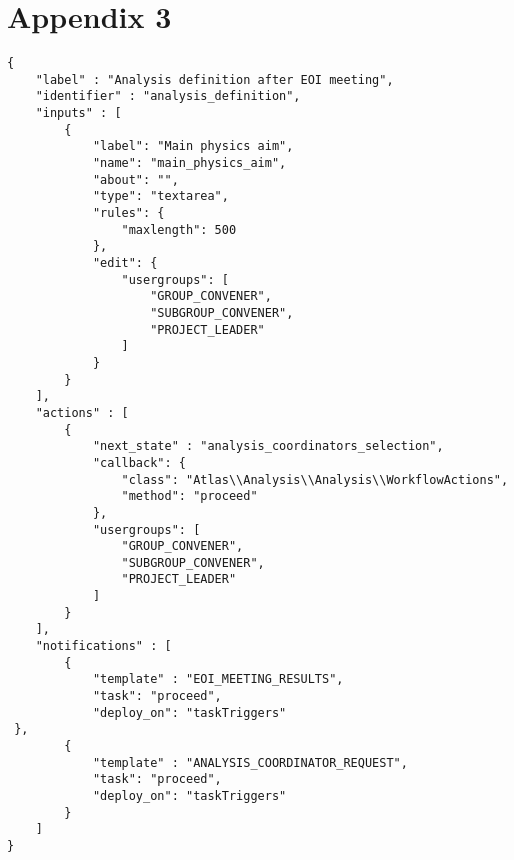 \section*{Appendix 3}
\label{sec:app3}

\begin{lstlisting}
{
    "label" : "Analysis definition after EOI meeting",
    "identifier" : "analysis_definition",
    "inputs" : [
        {
            "label": "Main physics aim",
            "name": "main_physics_aim",
            "about": "",
            "type": "textarea",
            "rules": {
                "maxlength": 500
            },
            "edit": {
                "usergroups": [
                    "GROUP_CONVENER",
                    "SUBGROUP_CONVENER",
                    "PROJECT_LEADER"
                ]
            }
        }
    ],
    "actions" : [
        {
            "next_state" : "analysis_coordinators_selection",
            "callback": {
                "class": "Atlas\\Analysis\\Analysis\\WorkflowActions",
                "method": "proceed"
            },
            "usergroups": [
                "GROUP_CONVENER",
                "SUBGROUP_CONVENER",
                "PROJECT_LEADER"
            ]
        }
    ],
    "notifications" : [
        {
            "template" : "EOI_MEETING_RESULTS",
            "task": "proceed",
            "deploy_on": "taskTriggers"
 },
        {
            "template" : "ANALYSIS_COORDINATOR_REQUEST",
            "task": "proceed",
            "deploy_on": "taskTriggers"
        }
    ]
}

\end{lstlisting}